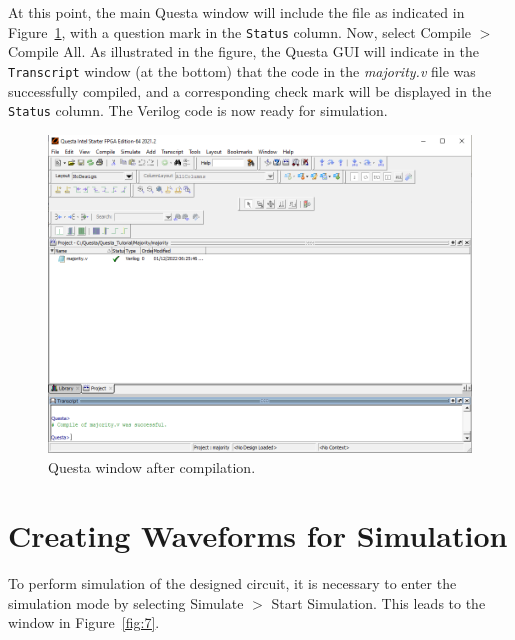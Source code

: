 \documentclass[11pt, twoside, pdftex]{article}
\begin{document}
At this point, the main Questa window will include the file as indicated in 
Figure~\ref{fig:6}, with a question mark in the \texttt{Status} column. Now, select
{\sf Compile $>$ Compile All}. As illustrated in the figure, the Questa GUI will
indicate in the \texttt{Transcript} window (at the bottom) that the code in the {\it majority.v}
file was successfully compiled, and a corresponding check mark will be displayed in 
the \texttt{Status} column.  The Verilog code is now ready for simulation.

\begin{figure}[H]
   \begin{center}
      \includegraphics[scale=0.6]{figures/compile.png}
   \caption{Questa window after compilation.} 
	 \label{fig:6}
	 \end{center}
\end{figure}

\section{Creating Waveforms for Simulation}

To perform simulation of the designed circuit, it is necessary to enter the simulation mode
by selecting {\sf Simulate $>$ Start Simulation}. This leads to the window in Figure~\ref{fig:7}.
\end{document}
